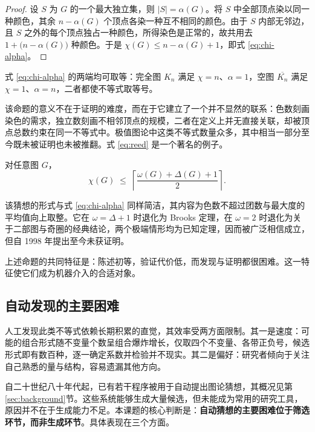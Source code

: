\begin{proof}
设 $S$ 为 $G$ 的一个最大独立集，则 $|S| = \alpha(G)$。将 $S$ 中全部顶点染以同一种颜色，其余 $n - \alpha(G)$ 个顶点各染一种互不相同的颜色。由于 $S$ 内部无邻边，且 $S$ 之外的每个顶点独占一种颜色，所得染色是正常的，故共用去 $1 + \bigl(n - \alpha(G)\bigr)$ 种颜色。于是 $\chi(G) \le n - \alpha(G) + 1$，即式 \eqref{eq:chi-alpha}。
\end{proof}

式 \eqref{eq:chi-alpha} 的两端均可取等：完全图 $K_n$ 满足 $\chi = n$、$\alpha = 1$，空图 $\overline{K_n}$ 满足 $\chi = 1$、$\alpha = n$，二者都使不等式取等号。

该命题的意义不在于证明的难度，而在于它建立了一个并不显然的联系：色数刻画染色的需求，独立数刻画不相邻顶点的规模，二者在定义上并无直接关联，却被顶点总数约束在同一不等式中。极值图论中这类不等式数量众多，其中相当一部分至今既未被证明也未被推翻。式 \eqref{eq:reed} 是一个著名的例子。

\begin{conjecture}[Reed, 1998]
\label{conj:reed}
对任意图 $G$，
\begin{equation}
  \chi(G) \;\le\; \left\lceil \frac{\omega(G) + \Delta(G) + 1}{2} \right\rceil .
  \label{eq:reed}
\end{equation}
\end{conjecture}

该猜想的形式与式 \eqref{eq:chi-alpha} 同样简洁，其内容为色数不超过团数与最大度的平均值向上取整。它在 $\omega = \Delta + 1$ 时退化为 Brooks 定理，在 $\omega = 2$ 时退化为关于二部图与奇圈的经典结论，两个极端情形均为已知定理，因而被广泛相信成立，但自 1998 年提出至今未获证明。

上述命题的共同特征是：陈述初等，验证代价低，而发现与证明都很困难。这一特征使它们成为机器介入的合适对象。

\subsection{自动发现的主要困难}

人工发现此类不等式依赖长期积累的直觉，其效率受两方面限制。其一是速度：可能的组合形式随不变量个数呈组合爆炸增长，仅取四个不变量、各带正负号，候选形式即有数百种，逐一确定系数并检验并不现实。其二是偏好：研究者倾向于关注自己熟悉的量与结构，容易遗漏其他方向。

自二十世纪八十年代起，已有若干程序被用于自动提出图论猜想，其概况见第\ref{sec:background}节。这些系统能够生成大量候选，但未能成为常用的研究工具，原因并不在于生成能力不足。本课题的核心判断是：\textbf{自动猜想的主要困难位于筛选环节，而非生成环节}。具体表现在三个方面。

